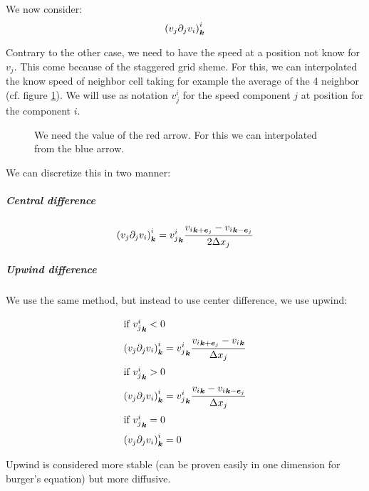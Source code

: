 We now consider:
\begin{equation}
\left(v_{j}\partial_{j}v_{i}\right)^{i}_{{\boldsymbol {k}}}
\end{equation}

\begin{remark}
  Contrary to the other case, we need to have the speed at a position not know for $v_{j}$. This come because of the staggered grid sheme.
  For this, we can interpolated the know speed of neighbor cell taking for example the average of the 4 neighbor (cf. figure \ref{fixed:staggered_convection_upwind}).
  We will use as notation $v_{j}^{i}$ for the speed component $j$ at position for the component $i$.
  
  \begin{figure}
    \caption{We need the value of the red arrow. For this we can interpolated from the blue arrow.}
    \label{fixed:staggered_convection_upwind}
    \end{figure}
\end{remark}

We can discretize this in two manner:

\subparagraph{Central difference}
\begin{equation}
\left(v_{j}\partial_{j}v_{i}\right)^{i}_{{\boldsymbol {k}}}={v_{j}^{i}}_{{\boldsymbol {k}}}\frac{{v_{i}}_{{\boldsymbol {k}}+{\boldsymbol {e}}_j}-{v_{i}}_{{\boldsymbol {k}}-{\boldsymbol {e}}_j}}{2\Delta x_{j}}
\end{equation}

\subparagraph{Upwind difference}

We use the same method, but instead to use center difference, we use upwind:

\begin{align}
\intertext{if ${v_{j}^{i}}_{{\boldsymbol {k}}}<0$}
\left(v_{j}\partial_{j}v_{i}\right)^{i}_{{\boldsymbol {k}}}&={v_{j}^{i}}_{{\boldsymbol {k}}}\frac{{v_{i}}_{{\boldsymbol {k}}+{\boldsymbol {e}}_j}-{v_{i}}_{{\boldsymbol {k}}}}{\Delta x_{j}}\\
\intertext{if ${v_{j}^{i}}_{{\boldsymbol {k}}}>0$}
\left(v_{j}\partial_{j}v_{i}\right)^{i}_{{\boldsymbol {k}}}&={v_{j}^{i}}_{{\boldsymbol {k}}}\frac{{v_{i}}_{{\boldsymbol {k}}}-{v_{i}}_{{\boldsymbol {k}}-{\boldsymbol {e}}_j}}{\Delta x_{j}}\\
\intertext{if ${v_{j}^{i}}_{{\boldsymbol {k}}}=0$}
\left(v_{j}\partial_{j}v_{i}\right)^{i}_{{\boldsymbol {k}}}&=0
\end{align}

Upwind is considered more stable (can be proven easily in one dimension for burger's equation) but more diffusive.

